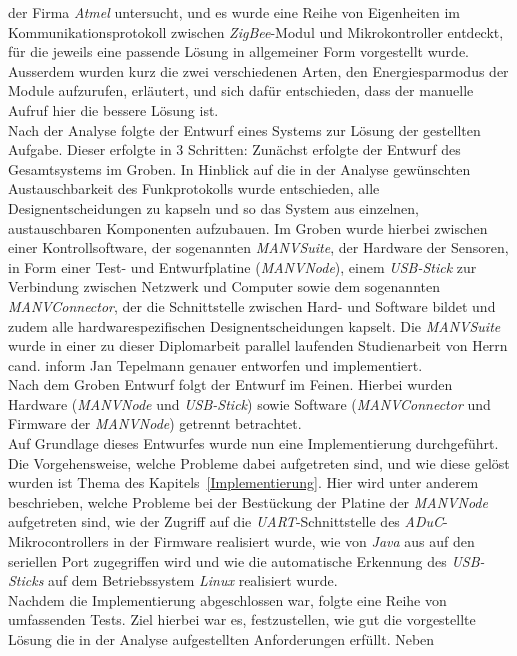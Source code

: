 der Firma \emph{Atmel} untersucht, und es wurde eine Reihe von Eigenheiten im Kommunikationsprotokoll 
zwischen \emph{ZigBee}-Modul und Mikrokontroller entdeckt, für die jeweils eine passende Lösung in 
allgemeiner Form vorgestellt wurde.  Ausserdem wurden kurz die zwei verschiedenen Arten, 
den Energiesparmodus der Module aufzurufen, erläutert, und sich dafür entschieden, dass der manuelle 
Aufruf hier die bessere Lösung ist.\\
Nach der Analyse folgte der Entwurf eines Systems zur Lösung der gestellten Aufgabe. Dieser erfolgte in 3 
Schritten: Zunächst erfolgte der Entwurf des Gesamtsystems im Groben. In Hinblick auf die in der Analyse
gewünschten Austauschbarkeit des Funkprotokolls wurde entschieden, alle Designentscheidungen zu kapseln und
so das System aus einzelnen, austauschbaren Komponenten aufzubauen. Im Groben wurde hierbei zwischen
einer Kontrollsoftware, der sogenannten \emph{MANVSuite}, der Hardware der Sensoren, in Form einer 
Test- und Entwurfplatine (\emph{MANVNode}), einem \emph{USB-Stick} zur Verbindung zwischen Netzwerk und Computer
sowie dem sogenannten \emph{MANVConnector}, der die Schnittstelle zwischen Hard- und Software bildet und zudem
alle hardwarespezifischen Designentscheidungen kapselt. Die \emph{MANVSuite} wurde in einer
zu dieser Diplomarbeit parallel laufenden Studienarbeit von Herrn cand. inform Jan Tepelmann genauer entworfen
und implementiert.\cite{Jan}\\
Nach dem Groben Entwurf folgt der Entwurf im Feinen. Hierbei wurden Hardware (\emph{MANVNode} und \emph{USB-Stick})
sowie Software (\emph{MANVConnector} und Firmware der \emph{MANVNode}) getrennt betrachtet.\\
Auf Grundlage dieses Entwurfes wurde nun eine Implementierung durchgeführt. Die Vorgehensweise, welche Probleme
dabei aufgetreten sind, und wie diese gelöst wurden ist Thema des Kapitels~\ref{Implementierung}.
Hier wird unter anderem beschrieben, welche Probleme bei der Bestückung der Platine der \emph{MANVNode} aufgetreten
sind, wie der Zugriff auf die \emph{UART}-Schnittstelle des \emph{ADuC}-Mikrocontrollers in der Firmware
realisiert wurde, wie von \emph{Java} aus auf den seriellen Port zugegriffen wird und wie die automatische
Erkennung des \emph{USB-Sticks} auf dem Betriebssystem \emph{Linux} realisiert wurde.\\
Nachdem die Implementierung abgeschlossen war, folgte eine Reihe von umfassenden Tests. Ziel hierbei war es,
festzustellen, wie gut die vorgestellte Lösung die in der Analyse aufgestellten Anforderungen erfüllt. Neben
